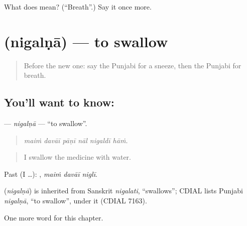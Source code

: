 \begin{tcolorbox}[breakable,colback=teal!4,colframe=teal!35!black,title={Before you move on}]
What does  mean? (\textquotedblleft{}Breath\textquotedblright{}.) Say it once more.
\end{tcolorbox}
\section[\texorpdfstring{\pa{ਨਿਗਲਣਾ} (nigalṇā)}{ਨਿਗਲਣਾ (nigalṇā)}]{ (nigalṇā) — to swallow}

\label{lesson:PA-C321-nigalna}



\begin{quote}
Before the new one: say the Punjabi for a sneeze, then the Punjabi for breath.
\end{quote}

\subsection*{You'll want to know: }
\textbf{} — \emph{nigalṇā} — \textquotedblleft{}to swallow\textquotedblright{}.

\begin{quote}
     
\end{quote}

\begin{quote}
\emph{maiṁ davāī pāṇī nāl nigaldī hāṁ.}
\end{quote}

\begin{quote}
I swallow the medicine with water.
\end{quote}

Past (I …):   , \emph{maiṁ davāī niglī}.

\begin{cousinweb}
\textbf{} (\emph{nigalṇā}) is inherited from Sanskrit \emph{nigalati}, \textquotedblleft{}swallows\textquotedblright{}; CDIAL lists Punjabi \emph{nigalṇā}, \textquotedblleft{}to swallow\textquotedblright{}, under it (CDIAL 7163).
\end{cousinweb}

\begin{grammarlens}[title={What you've built}]
One more word for this chapter.
\end{grammarlens}

